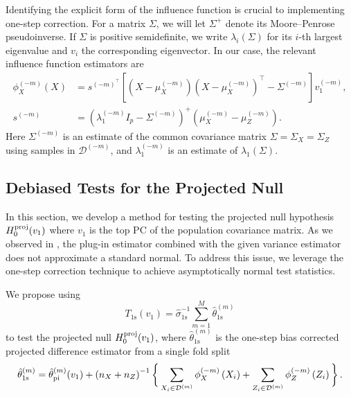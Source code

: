 \documentclass[11pt]{article}
\begin{document}
Identifying the explicit form of the influence function is crucial to implementing one-step correction. For a matrix $\Sigma$, we will let $\Sigma^{+}$ denote its Moore–Penrose pseudoinverse. If $\Sigma$ is positive semidefinite, we write $\lambda_i(\Sigma)$ for its $i$-th largest eigenvalue and $v_i$ the corresponding eigenvector. In our case, the relevant influence function estimators are 
\begin{equation}\label{eq: definition nuisance}
\begin{aligned}
\phi_X^{(-m)}(X) & =s^{(-m)^{\top}}\left[\left(X-\mu_X^{(-m)}\right)\left(X-\mu_X^{(-m)}\right)^{\top}-\Sigma^{(-m)}\right] v_1^{(-m)}, \\
s^{(-m)} & =\left(\lambda_1^{(-m)} I_p-\Sigma^{(-m)}\right)^{+}\left(\mu_X^{(-m)}-\mu_Z^{(-m)}\right) .
\end{aligned}
\end{equation}
Here $\Sigma^{(-m)}$ is an estimate of the common covariance matrix $\Sigma = \Sigma_X = \Sigma_Z$ using samples in $\mathcal{D}^{(-m)}$, and $\lambda_1^{(-m)}$ is an estimate of $\lambda_1(\Sigma)$. 

\subsection{Debiased Tests for the Projected Null}\label{section: debiased test}
In this section, we develop a method for testing the projected null hypothesis $H_0^{\rm proj}(v_1)$ where $v_1$ is the top PC of the population covariance matrix. As we observed in , the plug-in estimator combined with the given variance estimator does not approximate a standard normal. To address this issue, we leverage the one-step correction technique to achieve asymptotically normal test statistics. 

We propose using 
\begin{equation*}
T_{\mathrm{1s}}\left(v_1\right)=\hat{\sigma}_{\mathrm{1s}}^{-1} \sum_{m=1}^M \hat{\theta}_{\mathrm{1s}}^{(m)}
\end{equation*}
to test the projected null $H_0^{\rm proj}(v_1)$, where $\hat{\theta}_{\mathrm{1s}}^{(m)}$ is the one-step bias corrected projected difference estimator from a single fold split 
\begin{equation}\label{eq:debiased test statistics}
    \hat{\theta}_{\mathrm{1s}}^{(m)} = \hat{\theta}_{\rm pi}^{(m)}(v_1)+\left(n_X+n_Z\right)^{-1}\bigg\{\sum_{X_i \in \mathcal{D}^{(m)}} \phi_X^{(-m)}\left(X_i\right)+\sum_{Z_i \in \mathcal{D}^{(m)}} \phi_Z^{(-m)}\left(Z_i\right)\bigg\}\,.
\end{equation}
\end{document}

